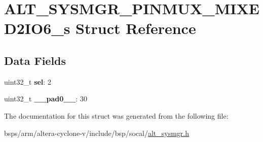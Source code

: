 \hypertarget{structALT__SYSMGR__PINMUX__MIXED2IO6__s}{}\section{A\+L\+T\+\_\+\+S\+Y\+S\+M\+G\+R\+\_\+\+P\+I\+N\+M\+U\+X\+\_\+\+M\+I\+X\+E\+D2\+I\+O6\+\_\+s Struct Reference}
\label{structALT__SYSMGR__PINMUX__MIXED2IO6__s}
\subsection*{Data Fields}
\begin{DoxyCompactItemize}
\item 
\mbox{\label{structALT__SYSMGR__PINMUX__MIXED2IO6__s_a048cdde9cf3bf8f7825a482eb671e2e7}} 
uint32\+\_\+t {\bfseries sel}\+: 2
\item 
\mbox{\label{structALT__SYSMGR__PINMUX__MIXED2IO6__s_a7db074974d9d9f729bfbae67fba78e00}} 
uint32\+\_\+t {\bfseries \+\_\+\+\_\+pad0\+\_\+\+\_\+}\+: 30
\end{DoxyCompactItemize}


The documentation for this struct was generated from the following file\+:\begin{DoxyCompactItemize}
\item 
bsps/arm/altera-\/cyclone-\/v/include/bsp/socal/\mbox{\hyperlink{alt__sysmgr_8h}{alt\+\_\+sysmgr.\+h}}\end{DoxyCompactItemize}
